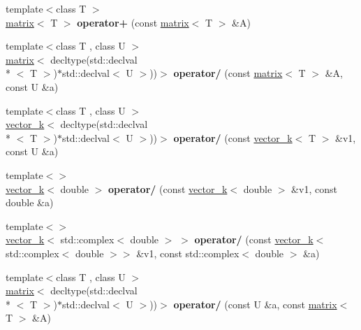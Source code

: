 \begin{DoxyCompactItemize}
\item 
\hypertarget{namespacekeycpp_a5b10f703c72875b9f5e2ecc5c7696f9c}{{\footnotesize template$<$class T $>$ }\\\hyperlink{classkeycpp_1_1matrix}{matrix}$<$ T $>$ {\bfseries operator+} (const \hyperlink{classkeycpp_1_1matrix}{matrix}$<$ T $>$ \&A)}\label{namespacekeycpp_a5b10f703c72875b9f5e2ecc5c7696f9c}

\item 
\hypertarget{namespacekeycpp_a3852c35cfcc8caa784465a26d04c68a1}{{\footnotesize template$<$class T , class U $>$ }\\\hyperlink{classkeycpp_1_1matrix}{matrix}$<$ decltype(std\-::declval\\*
$<$ T $>$)$\ast$std\-::declval$<$ U $>$))$>$ {\bfseries operator/} (const \hyperlink{classkeycpp_1_1matrix}{matrix}$<$ T $>$ \&A, const U \&a)}\label{namespacekeycpp_a3852c35cfcc8caa784465a26d04c68a1}

\item 
\hypertarget{namespacekeycpp_afce3d5f6cf95bb68e12f3f80ff146ed8}{{\footnotesize template$<$class T , class U $>$ }\\\hyperlink{classkeycpp_1_1vector__k}{vector\-\_\-k}$<$ decltype(std\-::declval\\*
$<$ T $>$)$\ast$std\-::declval$<$ U $>$))$>$ {\bfseries operator/} (const \hyperlink{classkeycpp_1_1vector__k}{vector\-\_\-k}$<$ T $>$ \&v1, const U \&a)}\label{namespacekeycpp_afce3d5f6cf95bb68e12f3f80ff146ed8}

\item 
\hypertarget{namespacekeycpp_acf439f423c568a970ddc8cde5940a0e8}{{\footnotesize template$<$$>$ }\\\hyperlink{classkeycpp_1_1vector__k}{vector\-\_\-k}$<$ double $>$ {\bfseries operator/} (const \hyperlink{classkeycpp_1_1vector__k}{vector\-\_\-k}$<$ double $>$ \&v1, const double \&a)}\label{namespacekeycpp_acf439f423c568a970ddc8cde5940a0e8}

\item 
\hypertarget{namespacekeycpp_aef7e4ab9c187ffa93e45ec90e2d1d5d4}{{\footnotesize template$<$$>$ }\\\hyperlink{classkeycpp_1_1vector__k}{vector\-\_\-k}$<$ std\-::complex$<$ double $>$ $>$ {\bfseries operator/} (const \hyperlink{classkeycpp_1_1vector__k}{vector\-\_\-k}$<$ std\-::complex$<$ double $>$$>$ \&v1, const std\-::complex$<$ double $>$ \&a)}\label{namespacekeycpp_aef7e4ab9c187ffa93e45ec90e2d1d5d4}

\item 
\hypertarget{namespacekeycpp_aafc0089bdf204385c1e627755c5070b0}{{\footnotesize template$<$class T , class U $>$ }\\\hyperlink{classkeycpp_1_1matrix}{matrix}$<$ decltype(std\-::declval\\*
$<$ T $>$)$\ast$std\-::declval$<$ U $>$))$>$ {\bfseries operator/} (const U \&a, const \hyperlink{classkeycpp_1_1matrix}{matrix}$<$ T $>$ \&A)}\label{namespacekeycpp_aafc0089bdf204385c1e627755c5070b0}


\end{DoxyCompactItemize}
